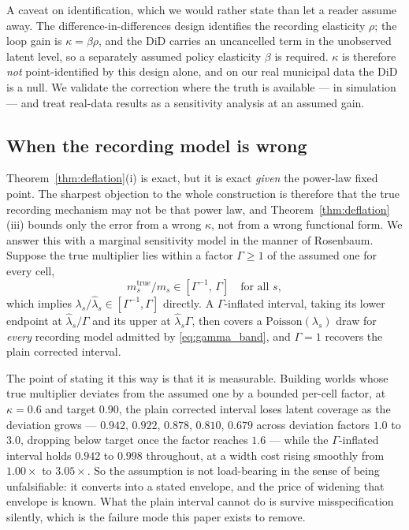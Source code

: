 \documentclass[journal,10pt,twocolumn]{IEEEtran}
\begin{document}
A caveat on identification, which we would rather state than let a reader assume
away. The difference-in-differences design identifies the recording elasticity
$\rho$; the loop gain is $\kappa = \beta\rho$, and the DiD carries an uncancelled
term in the unobserved latent level, so a separately assumed policy elasticity
$\beta$ is required. $\kappa$ is therefore \emph{not} point-identified by this
design alone, and on our real municipal data the DiD is a null. We validate the
correction where the truth is available --- in simulation --- and treat real-data
results as a sensitivity analysis at an assumed gain.

\subsection{When the recording model is wrong}
\label{sec:sensitivity}
Theorem~\ref{thm:deflation}(i) is exact, but it is exact \emph{given} the
power-law fixed point. The sharpest objection to the whole construction is
therefore that the true recording mechanism may not be that power law, and
Theorem~\ref{thm:deflation}(iii) bounds only the error from a wrong $\kappa$, not
from a wrong functional form. We answer this with a marginal sensitivity model in
the manner of Rosenbaum. Suppose the true multiplier lies within a factor
$\Gamma \ge 1$ of the assumed one for every cell,
\begin{equation}
\label{eq:gamma_band}
m^{\mathrm{true}}_s / m_s \in [\Gamma^{-1},\, \Gamma]
\quad\text{for all } s,
\end{equation}
which implies $\lambda_s / \hat{\lambda}_s \in [\Gamma^{-1}, \Gamma]$ directly. A
$\Gamma$-inflated interval, taking its lower endpoint at $\hat{\lambda}_s/\Gamma$
and its upper at $\hat{\lambda}_s\Gamma$, then covers a
$\mathrm{Poisson}(\lambda_s)$ draw for \emph{every} recording model admitted by
\eqref{eq:gamma_band}, and $\Gamma = 1$ recovers the plain corrected interval.

The point of stating it this way is that it is measurable. Building worlds whose
true multiplier deviates from the assumed one by a bounded per-cell factor, at
$\kappa = 0.6$ and target $0.90$, the plain corrected interval loses latent
coverage as the deviation grows --- $0.942$, $0.922$, $0.878$, $0.810$, $0.679$
across deviation factors $1.0$ to $3.0$, dropping below target once the factor
reaches $1.6$ --- while the $\Gamma$-inflated interval holds $0.942$ to $0.998$
throughout, at a width cost rising smoothly from $1.00\times$ to $3.05\times$.
So the assumption is not load-bearing in the sense of being unfalsifiable: it
converts into a stated envelope, and the price of widening that envelope is
known. What the plain interval cannot do is survive misspecification silently,
which is the failure mode this paper exists to remove.
\end{document}
